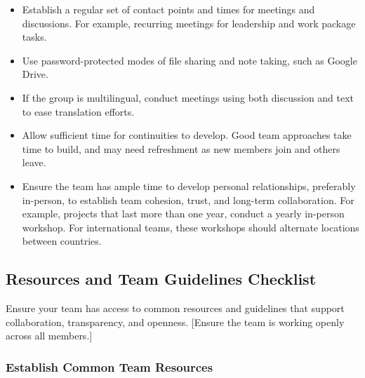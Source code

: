 \documentclass[
  letterpaper,
  DIV=11,
  numbers=noendperiod]{scrreport}
\providecommand{\tightlist}{%
  \setlength{\itemsep}{0pt}\setlength{\parskip}{0pt}}\usepackage{longtable,booktabs,array}
\begin{document}
\begin{itemize}
\tightlist
\item
  Establish a regular set of contact points and times for meetings and
  discussions. For example, recurring meetings for leadership and work
  package tasks.\\
\item
  Use password-protected modes of file sharing and note taking, such as
  Google Drive.
\item
  If the group is multilingual, conduct meetings using both discussion
  and text to ease translation efforts.\\
\item
  Allow sufficient time for continuities to develop. Good team
  approaches take time to build, and may need refreshment as new members
  join and others leave.
\item
  Ensure the team has ample time to develop personal relationships,
  preferably in-person, to establish team cohesion, trust, and long-term
  collaboration. For example, projects that last more than one year,
  conduct a yearly in-person workshop. For international teams, these
  workshops should alternate locations between countries.
\end{itemize}

\hypertarget{resources-and-team-guidelines-checklist}{%
\subsection{Resources and Team Guidelines
Checklist}\label{resources-and-team-guidelines-checklist}}

Ensure your team has access to common resources and guidelines that
support collaboration, transparency, and openness. {[}Ensure the team is
working openly across all members.{]}

\hypertarget{establish-common-team-resources}{%
\subsubsection{Establish Common Team
Resources}\label{establish-common-team-resources}}
\end{document}
